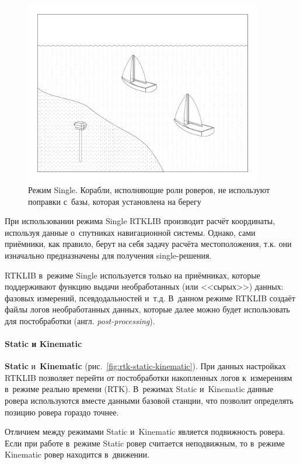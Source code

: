 \begin{figure}[h!]
  \centering
  \setlength{\fboxsep}{5pt}
  \includegraphics[height=8cm]{img/tikz/rtk-single/pic}
  \caption{Режим Single. Корабли, исполняющие роли роверов, не используют поправки с~базы, которая установлена на берегу}\label{fig:rtk-single}
\end{figure}

При использовании режима Single RTKLIB производит расчёт координаты, используя данные о~спутниках навигационной системы. Однако, сами приёмники, как правило, берут на себя задачу расчёта местоположения, т.к. они изначально предназначены для получения single-решения.

RTKLIB в~режиме Single используется только на приёмниках, которые поддерживают функцию выдачи необработанных (или <<сырых>>) данных: фазовых измерений, псевдодальностей и~т.д. В~данном режиме RTKLIB создаёт файлы логов необработанных данных, которые далее можно будет использовать для постобработки (англ. \emph{post-processing}).

\paragraph{Static и Kinematic}

\textbf{Static} и~\textbf{Kinematic} (рис.~\ref{fig:rtk-static-kinematic}). При данных настройках RTKLIB позволяет перейти от постобработки накопленных логов к~измерениям в~режиме реально времени (RTK). В~режимах Static и~Kinematic данные ровера используются вместе данными базовой станции, что позволит определять позицию ровера гораздо точнее.

Отличием между режимами Static и~Kinematic является подвижность ровера. Если при работе в~режиме Static ровер считается неподвижным, то в~режиме Kinematic ровер находится в~движении.


